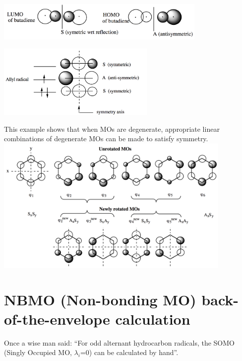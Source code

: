\documentclass[../Main/chem532-notes.tex]{subfiles}
\begin{document}
\begin{example}
\includegraphics[width=4in]{../huckel/c2_symmetry_ex1.png}
\end{example}

\begin{example}
\includegraphics[width=3in]{../huckel/c2_symmetry_ex2.png}
\end{example}

\begin{example}
This example shows that when MOs are degenerate, appropriate linear combinations of degenerate MOs can be made to satisfy symmetry.
\includegraphics[width=4.5in]{../huckel/c2_symmetry_ex3.png}
\end{example}




\section{NBMO (Non-bonding MO) back-of-the-envelope calculation}

Once a wise man said: ``For odd alternant hydrocarbon radicals, the SOMO (Singly Occupied MO, $\lambda_i$=0) can be calculated by hand''.
\end{document}

